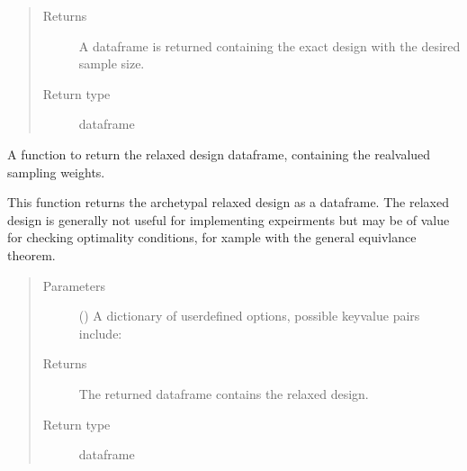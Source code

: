 \documentclass[letterpaper,10pt,english,openany,oneside]{sphinxmanual}
\begin{document}
\begin{fulllineitems}
\begin{fulllineitems}
\begin{quote}
\begin{description}
\begin{itemize}
\end{itemize}

\item[{Returns}] \leavevmode
A dataframe is returned containing the exact design with the desired sample size.

\item[{Return type}] \leavevmode
dataframe

\end{description}\end{quote}

\end{fulllineitems}


\begin{fulllineitems}
\label{\detokenize{nloed:nloed.design.Design.relaxed}}
A function to return the relaxed design dataframe, containing the real\sphinxhyphen{}valued sampling
weights.

This function returns the archetypal relaxed design as a dataframe.
The relaxed design is generally not useful for implementing expeirments but may be of value
for checking optimality conditions, for xample with the general equivlance theorem.
\begin{quote}\begin{description}
\item[{Parameters}] \leavevmode
{} (\sphinxstyleliteralemphasis{\sphinxupquote{, }}) \textendash{} A dictionary of user\sphinxhyphen{}defined options, possible key\sphinxhyphen{}value
pairs include:

\item[{Returns}] \leavevmode
The returned dataframe contains the relaxed design.

\item[{Return type}] \leavevmode
dataframe

\end{description}\end{quote}

\end{fulllineitems}



\end{fulllineitems}
\end{document}
